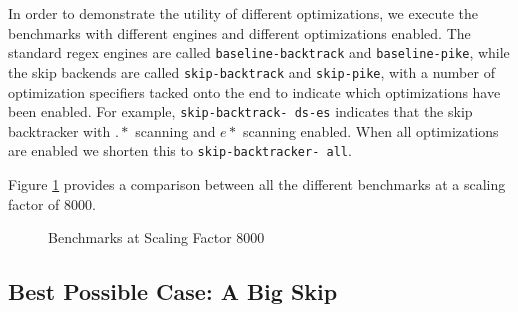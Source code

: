 In order to demonstrate the utility of different optimizations,
we execute the benchmarks with different engines and different
optimizations enabled. The standard regex engines are called
\texttt{baseline\allowbreak -\allowbreak backtrack} and
\texttt{baseline\allowbreak -\allowbreak pike}, while the
skip backends are called \texttt{skip\allowbreak -\allowbreak backtrack}
and \texttt{skip\allowbreak -\allowbreak pike},
with a number of optimization specifiers tacked onto the end to
indicate which optimizations have been enabled. For example,
\texttt{skip\allowbreak -\allowbreak backtrack\allowbreak -\allowbreak
        ds\allowbreak -\allowbreak es}
indicates that the skip backtracker with $.*$ scanning and $e*$ scanning
enabled. When all optimizations are enabled we shorten this to
\texttt{skip\allowbreak -\allowbreak backtracker\allowbreak -\allowbreak
all}.

Figure \ref{fig:8000:all} provides a comparison between all the
different benchmarks at a scaling factor of 8000.

\begin{figure}
\caption{Benchmarks at Scaling Factor 8000}
\label{fig:8000:all}

\end{figure}


\subsection{Best Possible Case: A Big Skip}

